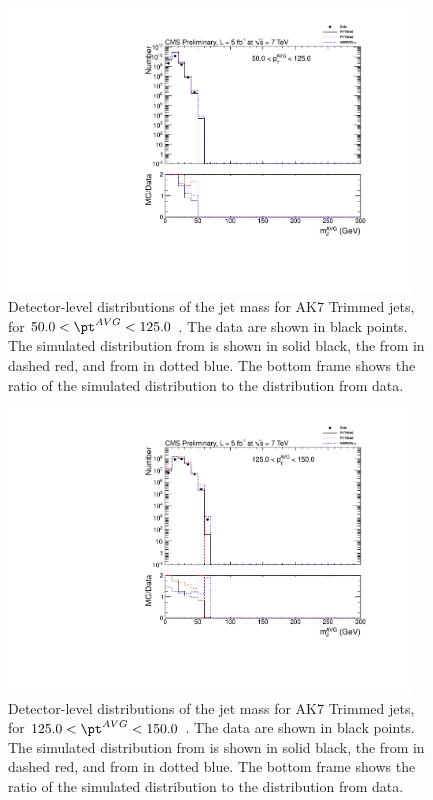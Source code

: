 \clearpage



\begin{figure}[htbp]
\centering
\includegraphics[width=0.95\textwidth]{figs/histAK7MjetVsPtAvg_rawDataMCComparisons_pt_1_Trimmed}
\caption{Detector-level distributions of the jet mass for AK7 Trimmed jets,
for $50.0 < \pt^{AVG} < 125.0$ \GeVc. The data are shown in black points.
The simulated distribution from \PYTHIA is shown in solid black, 
the from \PYTHIAEIGHT in dashed red, and from \HERWIG in dotted blue. 
The bottom frame shows the ratio of the simulated distribution
to the distribution from data. 
\label{figs:histAK7MjetVsPtAvg_rawDataMCComparisons_pt_1_Trimmed}}
\end{figure}



\begin{figure}[htbp]
\centering
\includegraphics[width=0.95\textwidth]{figs/histAK7MjetVsPtAvg_rawDataMCComparisons_pt_2_Trimmed}
\caption{Detector-level distributions of the jet mass for AK7 Trimmed jets,
for $125.0 < \pt^{AVG} < 150.0$ \GeVc. The data are shown in black points.
The simulated distribution from \PYTHIA is shown in solid black, 
the from \PYTHIAEIGHT in dashed red, and from \HERWIG in dotted blue. 
The bottom frame shows the ratio of the simulated distribution
to the distribution from data. 
\label{figs:histAK7MjetVsPtAvg_rawDataMCComparisons_pt_2_Trimmed}}
\end{figure}




